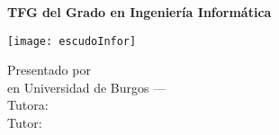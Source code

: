 \renewcommand\maketitle{
    \thispagestyle{empty}

    \cabecera
    \vfill

    \begin{minipage}{0.74\textwidth}
        \begin{tcolorbox}[
                colback=blue!10,
                colframe=blue!20!black!40,
                top=16pt,
                bottom=16pt
            ]
            \begin{center}
                \large\textbf{TFG del Grado en Ingeniería Informática}

                \bigbreak

                \LARGE\textbf{\thetitle}
            \end{center}
        \end{tcolorbox}
    \end{minipage}
    \hfill
    \begin{minipage}{0.2\textwidth}
        \texttt{[image: escudoInfor]}
    \end{minipage}


    \vfill

    \begin{center}
        \noindent\LARGE
        Presentado por \theauthor\\
        en Universidad de Burgos --- \thedate\\
        Tutora: \thetutor\\
        Tutor: \thecotutor\\
    \end{center}

    \clearpage
}
\maketitle
